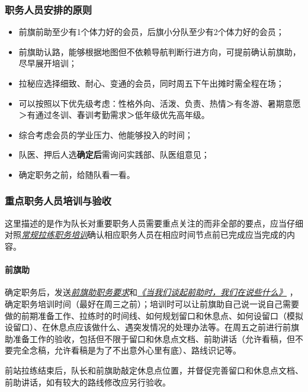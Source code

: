 \documentclass[UTF8]{ctexart}
\begin{document}
\subsubsection{职务人员安排的原则}

\begin{itemize}[nosep,left=2em]
    \item 前旗前助至少有1个体力好的会员，后旗小分队至少有2个体力好的会员；
    \item 前旗助认路，能够根据地图但不依赖导航判断行进方向，可提前确认前旗助，尽早展开培训；
    \item 拉秘应选择细致、耐心、变通的会员，同时周五下午出摊时需全程在场；
    \item 可以按照以下优先级考虑：性格外向、活泼、负责、热情＞有冬游、暑期意愿＞有通过冬训、春训考勤需求＞低年级优先高年级。
    \item 综合考虑会员的学业压力、他能够投入的时间；
    \item 队医、押后人选\textbf{确定后}需询问实践部、队医组意见；
    \item 确定职务之前，给随队看一看。    
\end{itemize}

\subsubsection{重点职务人员培训与验收}

这里描述的是作为队长对重要职务人员需要重点关注的而非全部的要点，应当仔细对照\href{https://chexie.net/bbs/content/?bid=7&tid=1062&p=1}{\textit{常规拉练职务培训}}确认相应职务人员在相应时间节点前已完成应当完成的内容。

\paragraph{前旗助}

确定职务后，发送\href{https://chexie.net/bbs/content/?bid=7&tid=1062&p=1#2}{\textit{前旗助职务要求}}和\href{https://www.chexie.net/bbs/content/?bid=7&tid=879&p=1}{\textit{《当我们谈起前助时，我们在说些什么》}}
，确定职务培训时间（最好在周三之前）；培训时可以让前旗助自己说一说自己需要做的前期准备工作、拉练时的时间线、如何规划留口和休息点、如何设留口（模拟设留口）、在休息点应该做什么、遇突发情况的处理办法等。在周五之前进行前旗助准备工作的验收，包括但不限于留口和休息点文档、前助讲话（允许看稿，但不要完全念稿，允许看稿是为了不出意外心里有底）、路线识记等。

前站拉练结束后，队长和前旗助敲定休息点位置，并督促完善留口和休息点文档、前助讲话，如有较大的路线修改应另行验收。
\end{document}

